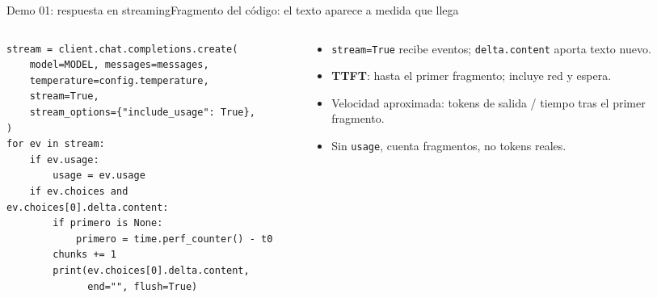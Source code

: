 \begin{frame}[fragile]{Demo 01: respuesta en streaming}{Fragmento del código: el texto aparece a medida que llega}
	\begin{columns}[T]
		\begin{column}{0.58\textwidth}
			\begin{lstlisting}
stream = client.chat.completions.create(
    model=MODEL, messages=messages,
    temperature=config.temperature,
    stream=True,
    stream_options={"include_usage": True},
)
for ev in stream:
    if ev.usage:
        usage = ev.usage
    if ev.choices and ev.choices[0].delta.content:
        if primero is None:
            primero = time.perf_counter() - t0
        chunks += 1
        print(ev.choices[0].delta.content,
              end="", flush=True)
\end{lstlisting}
		\end{column}
		\begin{column}{0.4\textwidth}
			\footnotesize
			\begin{itemize}
				\item \texttt{stream=True} recibe eventos; \texttt{delta.content} aporta texto nuevo.
				\item \textbf{TTFT}: hasta el primer fragmento; incluye red y espera.
				\item Velocidad aproximada: tokens de salida / tiempo tras el primer fragmento.
				\item Sin \texttt{usage}, cuenta fragmentos, no tokens reales.
			\end{itemize}
		\end{column}
	\end{columns}
\end{frame}

